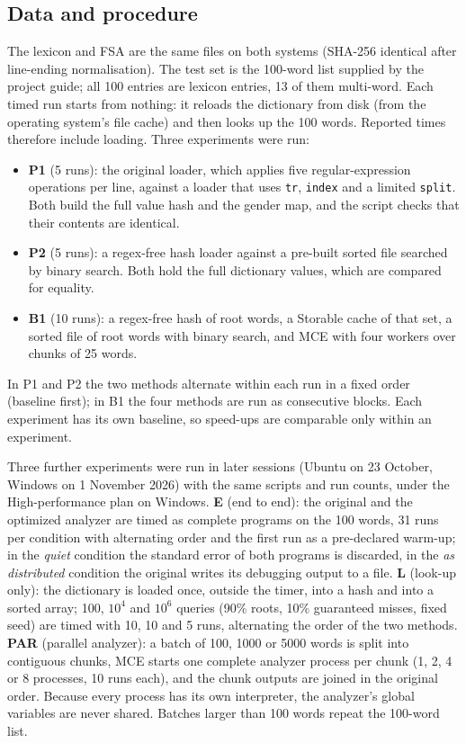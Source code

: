 \documentclass[conference]{IEEEtran}
\begin{document}
\subsection{Data and procedure}
The lexicon and FSA are the same files on both systems (SHA-256 identical after line-ending normalisation). The test set is the 100-word list supplied by the project guide; all 100 entries are lexicon entries, 13 of them multi-word. Each timed run starts from nothing: it reloads the dictionary from disk (from the operating system's file cache) and then looks up the 100 words. Reported times therefore include loading. Three experiments were run:
\begin{itemize}
\item \textbf{P1} (5 runs): the original loader, which applies five regular-expression operations per line, against a loader that uses \texttt{tr}, \texttt{index} and a limited \texttt{split}. Both build the full value hash and the gender map, and the script checks that their contents are identical.
\item \textbf{P2} (5 runs): a regex-free hash loader against a pre-built sorted file searched by binary search. Both hold the full dictionary values, which are compared for equality.
\item \textbf{B1} (10 runs): a regex-free hash of root words, a Storable cache of that set, a sorted file of root words with binary search, and MCE with four workers over chunks of 25 words.
\end{itemize}
In P1 and P2 the two methods alternate within each run in a fixed order (baseline first); in B1 the four methods are run as consecutive blocks. Each experiment has its own baseline, so speed-ups are comparable only within an experiment.

Three further experiments were run in later sessions (Ubuntu on 23 October, Windows on 1 November 2026) with the same scripts and run counts, under the High-performance plan on Windows. \textbf{E} (end to end): the original and the optimized analyzer are timed as complete programs on the 100 words, 31 runs per condition with alternating order and the first run as a pre-declared warm-up; in the \emph{quiet} condition the standard error of both programs is discarded, in the \emph{as distributed} condition the original writes its debugging output to a file. \textbf{L} (look-up only): the dictionary is loaded once, outside the timer, into a hash and into a sorted array; 100, $10^4$ and $10^6$ queries (90\% roots, 10\% guaranteed misses, fixed seed) are timed with 10, 10 and 5 runs, alternating the order of the two methods. \textbf{PAR} (parallel analyzer): a batch of 100, 1000 or 5000 words is split into contiguous chunks, MCE starts one complete analyzer process per chunk (1, 2, 4 or 8 processes, 10 runs each), and the chunk outputs are joined in the original order. Because every process has its own interpreter, the analyzer's global variables are never shared. Batches larger than 100 words repeat the 100-word list.
\end{document}
